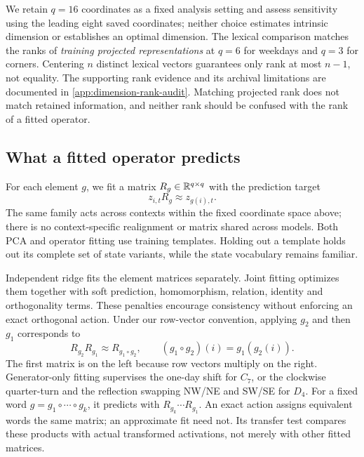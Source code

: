 We retain $q=16$ coordinates as a fixed analysis setting and assess sensitivity using the leading eight saved coordinates; neither choice estimates intrinsic dimension or establishes an optimal dimension. The lexical comparison matches the ranks of \emph{training projected representations} at $q=6$ for weekdays and $q=3$ for corners. Centering $n$ distinct lexical vectors guarantees only rank at most $n-1$, not equality. The supporting rank evidence and its archival limitations are documented in \cref{app:dimension-rank-audit}. Matching projected rank does not match retained information, and neither rank should be confused with the rank of a fitted operator.

\subsection{What a fitted operator predicts}
For each element $g$, we fit a matrix $R_g\in\mathbb{R}^{q\times q}$ with the prediction target
\begin{equation}
 z_{i,t}R_g\approx z_{g(i),t}.
 \label{eq:prediction}
\end{equation}
The same family acts across contexts within the fixed coordinate space above; there is no context-specific realignment or matrix shared across models. Both PCA and operator fitting use training templates. Holding out a template holds out its complete set of state variants, while the state vocabulary remains familiar.

Independent ridge fits the element matrices separately. Joint fitting optimizes them together with soft prediction, homomorphism, relation, identity and orthogonality terms. These penalties encourage consistency without enforcing an exact orthogonal action. Under our row-vector convention, applying $g_2$ and then $g_1$ corresponds to
\begin{equation}
 R_{g_2}R_{g_1}\approx R_{g_1\circ g_2},
 \qquad (g_1\circ g_2)(i)=g_1(g_2(i)).
 \label{eq:convention}
\end{equation}
The first matrix is on the left because row vectors multiply on the right. Generator-only fitting supervises the one-day shift for $C_7$, or the clockwise quarter-turn and the reflection swapping NW/NE and SW/SE for $D_4$. For a fixed word $g=g_1\circ\cdots\circ g_k$, it predicts with $R_{g_k}\cdots R_{g_1}$. An exact action assigns equivalent words the same matrix; an approximate fit need not. Its transfer test compares these products with actual transformed activations, not merely with other fitted matrices.

